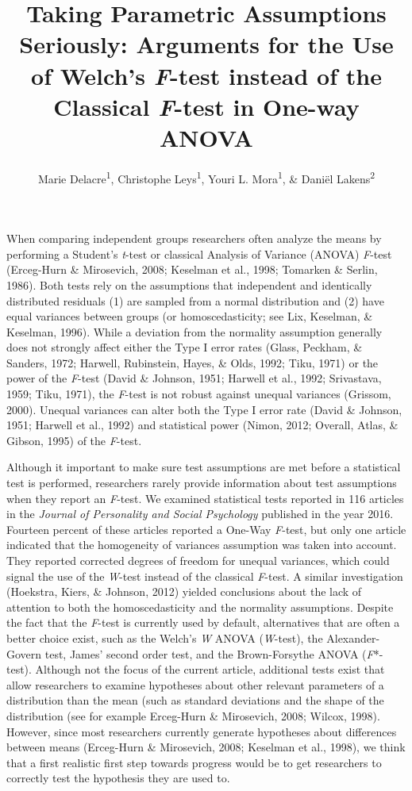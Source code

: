 \documentclass[man,floatsintext]{apa6}
\title{Taking Parametric Assumptions Seriously: Arguments for the Use of Welch's \emph{F}-test instead of the Classical \emph{F}-test in One-way ANOVA}
\author{Marie Delacre\textsuperscript{1}, Christophe Leys\textsuperscript{1}, Youri L. Mora\textsuperscript{1}, \& Daniël Lakens\textsuperscript{2}}
\date{}
\affiliation{
\vspace{0.5cm}
\textsuperscript{1} Université Libre de Bruxelles, Service of Analysis of the Data (SAD), Bruxelles, Belgium\\\textsuperscript{2} Eindhoven University of Technology, Human Technology Interaction Group, Eindhoven, the Netherlands }
\begin{document}
\maketitle

When comparing independent groups researchers often analyze the means by performing a Student's \emph{t}-test or classical Analysis of Variance (ANOVA) \emph{F}-test (Erceg-Hurn \& Mirosevich, 2008; Keselman et al., 1998; Tomarken \& Serlin, 1986). Both tests rely on the assumptions that independent and identically distributed residuals (1) are sampled from a normal distribution and (2) have equal variances between groups (or homoscedasticity; see Lix, Keselman, \& Keselman, 1996). While a deviation from the normality assumption generally does not strongly affect either the Type I error rates (Glass, Peckham, \& Sanders, 1972; Harwell, Rubinstein, Hayes, \& Olds, 1992; Tiku, 1971) or the power of the \emph{F}-test (David \& Johnson, 1951; Harwell et al., 1992; Srivastava, 1959; Tiku, 1971), the \emph{F}-test is not robust against unequal variances (Grissom, 2000). Unequal variances can alter both the Type I error rate (David \& Johnson, 1951; Harwell et al., 1992) and statistical power (Nimon, 2012; Overall, Atlas, \& Gibson, 1995) of the \emph{F}-test.

Although it important to make sure test assumptions are met before a statistical test is performed, researchers rarely provide information about test assumptions when they report an \emph{F}-test. We examined statistical tests reported in 116 articles in the \emph{Journal of Personality and Social Psychology} published in the year 2016. Fourteen percent of these articles reported a One-Way \emph{F}-test, but only one article indicated that the homogeneity of variances assumption was taken into account. They reported corrected degrees of freedom for unequal variances, which could signal the use of the \emph{W}-test instead of the classical \emph{F}-test. A similar investigation (Hoekstra, Kiers, \& Johnson, 2012) yielded conclusions about the lack of attention to both the homoscedasticity and the normality assumptions. Despite the fact that the \emph{F}-test is currently used by default, alternatives that are often a better choice exist, such as the Welch's \emph{W} ANOVA (\emph{W}-test), the Alexander-Govern test, James' second order test, and the Brown-Forsythe ANOVA (\emph{F}*-test). Although not the focus of the current article, additional tests exist that allow researchers to examine hypotheses about other relevant parameters of a distribution than the mean (such as standard deviations and the shape of the distribution (see for example Erceg-Hurn \& Mirosevich, 2008; Wilcox, 1998). However, since most researchers currently generate hypotheses about differences between means (Erceg-Hurn \& Mirosevich, 2008; Keselman et al., 1998), we think that a first realistic first step towards progress would be to get researchers to correctly test the hypothesis they are used to.
\end{document}
